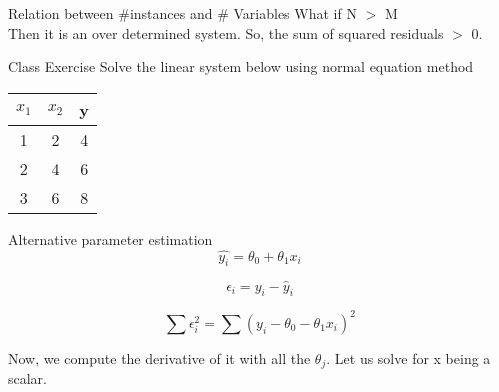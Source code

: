 \documentclass{beamer}
\begin{document}
\begin{frame}{Relation between \#instances and \# Variables}
   What if N $>$ M\\
   \pause   Then it is an over determined system. So, the sum of squared residuals $>$ 0.
\end{frame}





\begin{frame}{Class Exercise}
Solve the linear system below using normal equation method
\begin{center}
	\begin{tabular}{||c c | c||} 
		\hline
		$x_{1}$  & $x_{2}$ & y  \\ [0.5ex] 
		\hline\hline
		1 & 2 & 4 \\
		2 & 4 & 6\\
		3 & 6 & 8\\
		\hline
	\end{tabular}
\end{center}
\end{frame}


%    
%    
%    
%
\begin{frame}{Alternative parameter estimation}
    $$
    \hat{y_{i}} = \theta_{0} + \theta_{1}x_{i}
    $$
    
    \pause $$
    \epsilon_{i} = y_{i} - \hat{y}_{i}
    $$
    
    \pause $$
    \sum \epsilon_{i}^{2} = \sum (y_{i} - \theta_{0} - \theta_{1}x_{i})^{2}
    $$
    
    \pause Now, we compute the derivative of it with all the  $\theta_{j}$. Let us solve for x being a scalar.
    
    
\end{frame}
\end{document}
